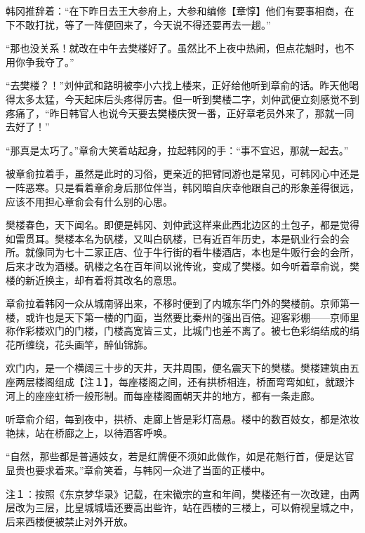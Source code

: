 韩冈推辞着：“在下昨日去王大参府上，大参和编修【章惇】他们有要事相商，在下不敢打扰，等了一阵便回来了，今天说不得还要再去一趟。”

“那也没关系！就改在中午去樊楼好了。虽然比不上夜中热闹，但点花魁时，也不用你争我夺了。”

“去樊楼？！”刘仲武和路明被李小六找上楼来，正好给他听到章俞的话。昨天他喝得太多太猛，今天起床后头疼得厉害。但一听到樊楼二字，刘仲武便立刻感觉不到疼痛了，“昨日韩官人也说今天要去樊楼庆贺一番，正好章老员外来了，那就一同去好了！”

“那真是太巧了。”章俞大笑着站起身，拉起韩冈的手：“事不宜迟，那就一起去。”

被章俞拉着手，虽然是此时的习俗，更亲近的把臂同游也是常见，可韩冈心中还是一阵恶寒。只是看着章俞身后那位伴当，韩冈暗自庆幸他跟自己的形象差得很远，应该不用担心章俞会有什么别的心思。

樊楼春色，天下闻名。即便是韩冈、刘仲武这样来此西北边区的土包子，都是觉得如雷贯耳。樊楼本名为矾楼，又叫白矾楼，已有近百年历史，本是矾业行会的会所。就像同为七十二家正店、位于牛行街的看牛楼酒店，本也是牛贩行会的会所，后来才改为酒楼。矾楼之名在百年间以讹传讹，变成了樊楼。如今听着章俞说，樊楼的新近换主，却有着将其改名的意思。

章俞拉着韩冈一众从城南驿出来，不移时便到了内城东华门外的樊楼前。京师第一楼，或许也是天下第一楼的门面，当然要比秦州的强出百倍。迎客彩棚——京师里称作彩楼欢门的门楼，门楼高宽皆三丈，比城门也差不离了。被七色彩绢结成的绢花所缠绕，花头画竿，醉仙锦旆。

欢门内，是一个横阔三十步的天井，天井周围，便名震天下的樊楼。樊楼建筑由五座两层楼阁组成【注１】，每座楼阁之间，还有拱桥相连，桥面弯弯如虹，就跟汴河上的座座虹桥一般形制。而每座楼阁面朝天井的地方，都有一条走廊。

听章俞介绍，每到夜中，拱桥、走廊上皆是彩灯高悬。楼中的数百妓女，都是浓妆艳抹，站在桥廊之上，以待酒客呼唤。

“自然，那些都是普通妓女，若是红牌便不须如此做作，如是花魁行首，便是达官显贵也要求着来。”章俞笑着，与韩冈一众进了当面的正楼中。

注１：按照《东京梦华录》记载，在宋徽宗的宣和年间，樊楼还有一次改建，由两层改为三层，比皇城城墙还要高出些许，站在西楼的三楼上，可以俯视皇城之中，后来西楼便被禁止对外开放。

